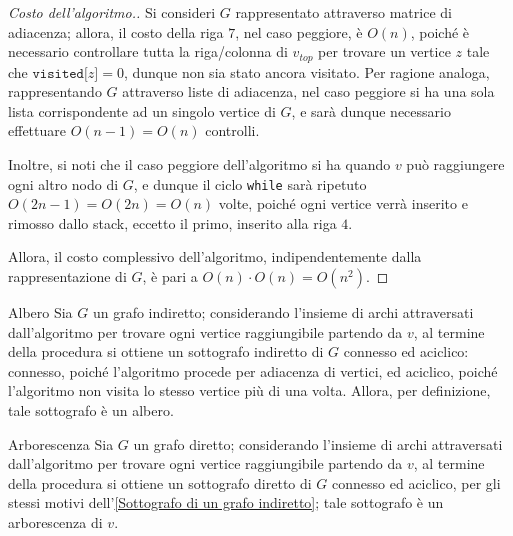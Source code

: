 \documentclass[a4paper, 12pt]{report}
\begin{document}
    \begin{proof}[Costo dell'algoritmo.]
        Si consideri $G$ rappresentato attraverso matrice di adiacenza; allora, il costo della riga $7$, nel caso peggiore, è $O(n)$, poiché è necessario controllare tutta la riga/colonna di $v_{top}$ per trovare un vertice $z$ tale che $\texttt{visited[}z\texttt{]} = 0$, dunque non sia stato ancora visitato. Per ragione analoga, rappresentando $G$ attraverso liste di adiacenza, nel caso peggiore si ha una sola lista corrispondente ad un singolo vertice di $G$, e sarà dunque necessario effettuare $O(n - 1) = O(n)$ controlli.

        Inoltre, si noti che il caso peggiore dell'algoritmo si ha quando $v$ può raggiungere ogni altro nodo di $G$, e dunque il ciclo \texttt{while} sarà ripetuto $O(2n - 1) = O(2n) = O(n)$ volte, poiché ogni vertice verrà inserito e rimosso dallo stack, eccetto il primo, inserito alla riga $4$.

        Allora, il costo complessivo dell'algoritmo, indipendentemente dalla rappresentazione di $G$, è pari a $O(n) \cdot O(n) = O(n^2)$.
    \end{proof}

    \begin{framedobs}[label={Sottografo di un grafo indiretto}]{Albero}
        Sia $G$ un grafo indiretto; considerando l'insieme di archi attraversati dall'algoritmo per trovare ogni vertice raggiungibile partendo da $v$, al termine della procedura si ottiene un sottografo indiretto di $G$ connesso ed aciclico: connesso, poiché l'algoritmo procede per adiacenza di vertici, ed aciclico, poiché l'algoritmo non visita lo stesso vertice più di una volta. Allora, per definizione, tale sottografo è un albero.
    \end{framedobs}

    \begin{framedobs}{Arborescenza}
        Sia $G$ un grafo diretto; considerando l'insieme di archi attraversati dall'algoritmo per trovare ogni vertice raggiungibile partendo da $v$, al termine della procedura si ottiene un sottografo diretto di $G$ connesso ed aciclico, per gli stessi motivi dell'\cref{Sottografo di un grafo indiretto}; tale sottografo è un arborescenza di $v$.
    \end{framedobs}
\end{document}
